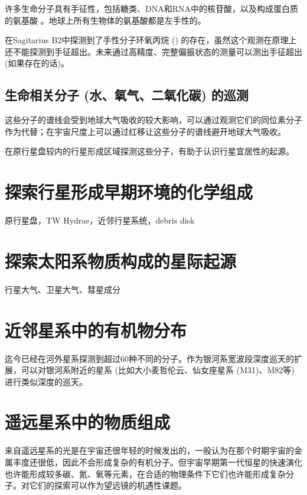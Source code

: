 \documentclass{report}
\newcommand\sgrb{Sagitarius B2}
\newcommand\twh{TW Hydrae}
\begin{document}
许多生命分子具有手征性，包括糖类、DNA和RNA中的核苷酸，以及构成蛋白质的氨基酸 \citep{McGuire2016}。地球上所有生物体的氨基酸都是左手性的。

\citet{McGuire2016a} 在\sgrb 中探测到了手性分子环氧丙烷 () 的存在，虽然这个观测在原理上还不能探测到手征超出。未来通过高精度、完整偏振状态的测量可以测出手征超出 (如果存在的话)。

\subsection{生命相关分子 (水、氧气、二氧化碳) 的巡测}

这些分子的谱线会受到地球大气吸收的较大影响，可以通过观测它们的同位素分子作为代替；在宇宙尺度上可以通过红移让这些分子的谱线避开地球大气吸收。

在原行星盘较内的行星形成区域探测这些分子，有助于认识行星宜居性的起源。

\section{探索行星形成早期环境的化学组成}

原行星盘，\twh，近邻行星系统，debris disk


\section{探索太阳系物质构成的星际起源}

行星大气、卫星大气、彗星成分

\section{近邻星系中的有机物分布}

迄今已经在河外星系探测到超过60种不同的分子。作为银河系宽波段深度巡天的扩展，可以对银河系附近的星系 (比如大小麦哲伦云、仙女座星系 (M31)、M82等) 进行类似深度的巡天。

\section{遥远星系中的物质组成}

来自遥远星系的光是在宇宙还很年轻的时候发出的，一般认为在那个时期宇宙的金属丰度还很低，因此不会形成复杂的有机分子。但宇宙早期第一代恒星的快速演化也许能形成较多碳、氮、氧等元素，在合适的物理条件下它们也许能形成复杂分子。对它们的探索可以作为望远镜的机遇性课题。
\end{document}
